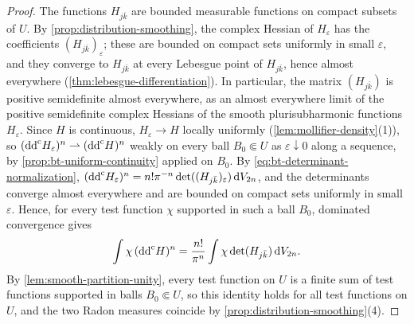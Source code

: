 \begin{proof}
The functions $H_{j\bar k}$ are bounded measurable functions on compact subsets of $U$. By \cref{prop:distribution-smoothing}, the complex Hessian of $H_\varepsilon$ has the coefficients $(H_{j\bar k})_\varepsilon$; these are bounded on compact sets uniformly in small $\varepsilon$, and they converge to $H_{j\bar k}$ at every Lebesgue point of $H_{j\bar k}$, hence almost everywhere (\cref{thm:lebesgue-differentiation}). In particular, the matrix $(H_{j\bar k})$ is positive semidefinite almost everywhere, as an almost everywhere limit of the positive semidefinite complex Hessians of the smooth plurisubharmonic functions $H_\varepsilon$. Since $H$ is continuous, $H_\varepsilon\to H$ locally uniformly (\cref{lem:mollifier-density}(1)), so $(\mathrm{dd}^{\mathrm{c}} H_\varepsilon)^n\rightharpoonup(\mathrm{dd}^{\mathrm{c}} H)^n$ weakly on every ball $B_0\Subset U$ as $\varepsilon\downarrow0$ along a sequence, by \cref{prop:bt-uniform-continuity} applied on $B_0$. By \eqref{eq:bt-determinant-normalization}, $(\mathrm{dd}^{\mathrm{c}} H_\varepsilon)^n=n!\pi^{-n}\det((H_{j\bar k})_\varepsilon)\,\mathrm dV_{2n}$, and the determinants converge almost everywhere and are bounded on compact sets uniformly in small $\varepsilon$. Hence, for every test function $\chi$ supported in such a ball $B_0$, dominated convergence gives
\[
 \int\chi\,(\mathrm{dd}^{\mathrm{c}} H)^n=\frac{n!}{\pi^n}\int\chi\det(H_{j\bar k})\,\mathrm dV_{2n}.
\]
By \cref{lem:smooth-partition-unity}, every test function on $U$ is a finite sum of test functions supported in balls $B_0\Subset U$, so this identity holds for all test functions on $U$, and the two Radon measures coincide by \cref{prop:distribution-smoothing}(4).
\end{proof}

